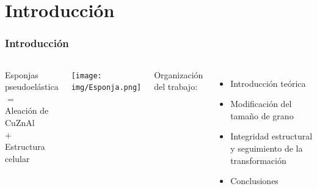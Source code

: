 \documentclass[usenames,dvipsnames]{beamer}
\begin{document}
\section{Introducción}


\begin{frame}
\frametitle{Introducción}
\begin{columns}
\begin{block}{
Esponjas pseudoelástica \\
\quad \quad \quad \quad $=$ \\
\quad Aleación de CuZnAl \\
\quad \quad \quad \quad $+$ \\
\quad Estructura celular}
\end{block}
\vfill
\begin{center}

\texttt{[image: img/Esponja.png]}
\end{center}

\begin{block}{
 Organización del trabajo:}
\end{block}
\begin{itemize}
 \item Introducción teórica
 \item Modificación del tamaño de grano
 \item Integridad estructural y seguimiento de la transformación
 \item Conclusiones
\end{itemize}

\end{columns}
\end{frame}
\end{document}
